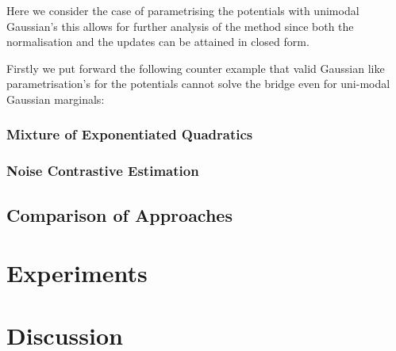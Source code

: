 \documentclass[a4paper,12pt,twoside,openright]{report}
\theoremstyle{definition}
\begin{document}
Here we consider the case of parametrising the potentials with unimodal Gaussian's this allows for further analysis of the method since both the normalisation and the updates can be attained in closed form. 

Firstly we put forward the following counter example that valid Gaussian like parametrisation's for the potentials cannot solve the bridge even for uni-modal Gaussian marginals:
\subsection{Mixture of Exponentiated Quadratics}

\subsection{Noise Contrastive Estimation}
\section{Comparison of Approaches}

\chapter{Experiments}

\chapter{Discussion}


\appendix
\singlespacing

 
 
\end{document}
